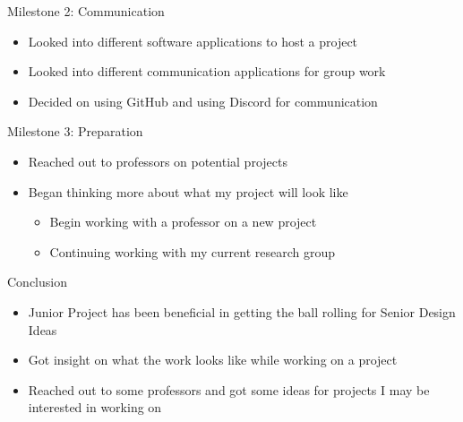 \documentclass[10pt]{beamer}
\begin{document}
\begin{frame}[fragile]{Milestone 2: Communication}
  \begin{itemize}
    \item Looked into different software applications to host a project
    \item Looked into different communication applications for group work
    \item Decided on using GitHub and using Discord for communication
  \end{itemize}
\end{frame}

\begin{frame}[fragile]{Milestone 3: Preparation}
  \begin{itemize}
    \item Reached out to professors on potential projects
    \item Began thinking more about what my project will look like
      \begin{itemize}
        \item Begin working with a professor on a new project
        \item Continuing working with my current research group
      \end{itemize}
  \end{itemize}
\end{frame}

\begin{frame}[fragile]{Conclusion}
  \begin{itemize}
    \item Junior Project has been beneficial in getting the ball rolling for Senior Design Ideas
    \item Got insight on what the work looks like while working on a project
    \item Reached out to some professors and got some ideas for projects I may be interested in working on
  \end{itemize}
\end{frame}
\end{document}
